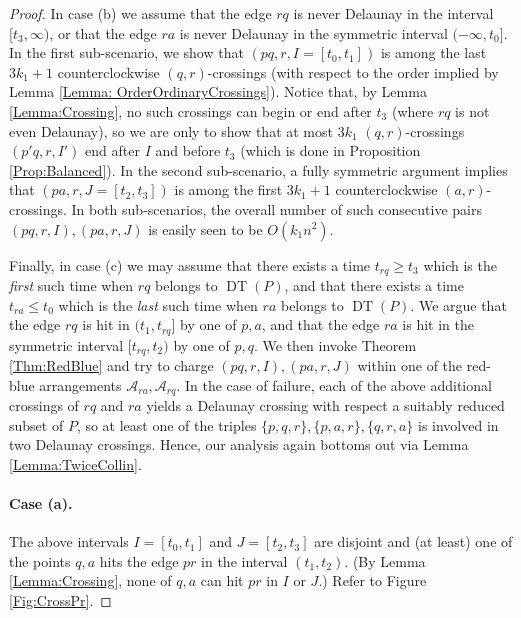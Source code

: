 \documentclass[letter,11pt]{article}
\def\A{\mathcal{A}}
\def\DT{\mathop{\mathrm{DT}}}
\begin{document}
\begin{proof}
In case (b) we assume that the edge $rq$ is never Delaunay in the interval $[t_3,\infty)$, or that the edge $ra$ is never Delaunay in the symmetric interval $(-\infty,t_0]$.
In the first sub-scenario, we show that $(pq,r,I=[t_0,t_1])$ is among the last $3k_1+1$ counterclockwise $(q,r)$-crossings (with respect to the order implied by Lemma \ref{Lemma: OrderOrdinaryCrossings}). Notice that, by Lemma \ref{Lemma:Crossing}, no such crossings can begin or end after $t_3$ (where $rq$ is not even Delaunay), so we are only to show that at most $3k_1$ $(q,r)$-crossings $(p'q,r,I')$ end after $I$ and before $t_3$ (which is done in Proposition \ref{Prop:Balanced}).
In the second sub-scenario, a fully symmetric argument implies that $(pa,r,J=[t_2,t_3])$ is among the first $3k_1+1$ counterclockwise $(a,r)$-crossings. In both sub-scenarios, the overall number of such consecutive pairs $(pq,r,I),(pa,r,J)$ is easily seen to be $O(k_1n^2)$.
 
Finally, in case (c) we may assume that there exists a time $t_{rq}\geq t_3$ which is the {\it first} such time when $rq$ belongs to $\DT(P)$, and that
there exists a time $t_{ra}\leq t_0$ which is the {\it last} such time when $ra$ belongs to $\DT(P)$.
We argue that the edge $rq$ is hit in $(t_1,t_{rq}]$ by one of $p,a$, and that the edge $ra$ is hit in the symmetric interval $[t_{rq},t_2)$ by one of $p,q$.
We then invoke Theorem \ref{Thm:RedBlue} and try to charge $(pq,r,I), (pa,r,J)$ within one of the red-blue arrangements $\A_{ra},\A_{rq}$. In the case of failure, each of the above additional crossings of $rq$ and $ra$ yields a Delaunay crossing with respect a suitably reduced subset of $P$, so at least one of the triples $\{p,q,r\},\{p,a,r\},\{q,r,a\}$ is involved in two Delaunay crossings. Hence, our analysis again bottoms out via Lemma \ref{Lemma:TwiceCollin}.









\paragraph{Case (a).} The above intervals $I=[t_0,t_1]$ and $J=[t_2,t_3]$ are disjoint and (at least) one of the points $q,a$ hits the edge $pr$ in the interval $(t_1,t_2)$. 
(By Lemma \ref{Lemma:Crossing}, none of $q,a$ can hit $pr$ in $I$ or $J$.) Refer to Figure \ref{Fig:CrossPr}.


\end{proof}
\end{document}
